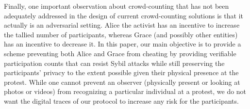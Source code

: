 Finally, one important observation about crowd-counting that has not been adequately addressed in the design of current crowd-counting solutions is that it actually is an adversarial setting. Alice the activist has an incentive to increase the tallied number of participants, whereas Grace (and possibly other entities) has an incentive to decrease it.
In this paper, our main objective is to provide a scheme preventing both Alice 
and Grace from cheating by providing verifiable participation counts that can resist Sybil attacks while still preserving the participants' privacy to the extent possible given their physical presence at the protest. While one cannot
prevent an observer (physically present or looking at photos or videos) from recognizing a particular individual at a protest, we do not want the digital traces of our protocol to increase any risk for the participants.



%

